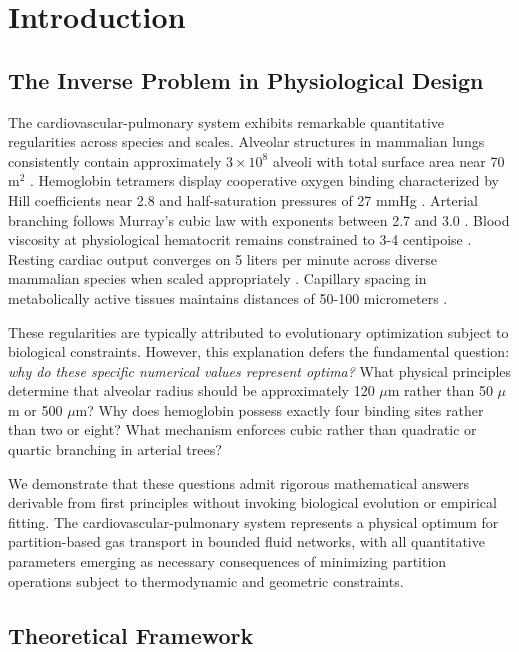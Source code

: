 \documentclass[10pt,twocolumn,a4paper]{article}
\theoremstyle{remark}
\begin{document}
\section{Introduction}

\subsection{The Inverse Problem in Physiological Design}

The cardiovascular-pulmonary system exhibits remarkable quantitative regularities across species and scales. Alveolar structures in mammalian lungs consistently contain approximately $3 \times 10^{8}$ alveoli with total surface area near 70 m$^{2}$ \cite{weibel1963morphometry}. Hemoglobin tetramers display cooperative oxygen binding characterized by Hill coefficients near 2.8 and half-saturation pressures of 27 mmHg \cite{perutz1970stereochemistry}. Arterial branching follows Murray's cubic law with exponents between 2.7 and 3.0 \cite{sherman1981meaning}. Blood viscosity at physiological hematocrit remains constrained to 3-4 centipoise \cite{chien1970blood}. Resting cardiac output converges on 5 liters per minute across diverse mammalian species when scaled appropriately \cite{holt1968hemodynamic}. Capillary spacing in metabolically active tissues maintains distances of 50-100 micrometers \cite{krogh1919number}.

These regularities are typically attributed to evolutionary optimization subject to biological constraints. However, this explanation defers the fundamental question: \textit{why do these specific numerical values represent optima?} What physical principles determine that alveolar radius should be approximately 120 $\mu$m rather than 50 $\mu$m or 500 $\mu$m? Why does hemoglobin possess exactly four binding sites rather than two or eight? What mechanism enforces cubic rather than quadratic or quartic branching in arterial trees?

We demonstrate that these questions admit rigorous mathematical answers derivable from first principles without invoking biological evolution or empirical fitting. The cardiovascular-pulmonary system represents a physical optimum for partition-based gas transport in bounded fluid networks, with all quantitative parameters emerging as necessary consequences of minimizing partition operations subject to thermodynamic and geometric constraints.

\subsection{Theoretical Framework}
\end{document}
